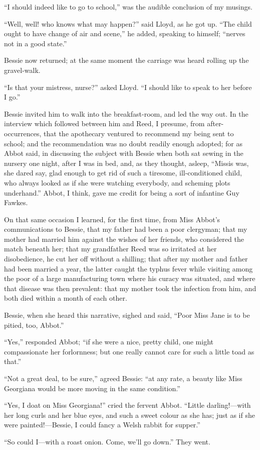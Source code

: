 \enquote{I should indeed like to go to school,} was the audible
conclusion of my musings.

\enquote{Well, well! who knows what may happen?} said \Mr{} Lloyd, as he
got up.  \enquote{The child ought to have change of air and scene,} he
added, speaking to himself; \enquote{nerves not in a good state.}

Bessie now returned; at the same moment the carriage was heard rolling
up the gravel-walk.

\enquote{Is that your mistress, nurse?} asked \Mr{} Lloyd.  \enquote{I
	should like to speak to her before I go.}

Bessie invited him to walk into the breakfast-room, and led the way
out.  In the interview which followed between him and \Mrs{} Reed, I
presume, from after-occurrences, that the apothecary ventured to
recommend my being sent to school; and the recommendation was no doubt
readily enough adopted; for as Abbot said, in discussing the subject
with Bessie when both sat sewing in the nursery one night, after I was
in bed, and, as they thought, asleep, \enquote{Missis was, she dared
	say, glad enough to get rid of such a tiresome, ill-conditioned child,
	who always looked as if she were watching everybody, and scheming plots
	underhand.}  Abbot, I think, gave me credit for being a sort of
infantine Guy Fawkes.

On that same occasion I learned, for the first time, from Miss Abbot's
communications to Bessie, that my father had been a poor clergyman; that
my mother had married him against the wishes of her friends, who
considered the match beneath her; that my grandfather Reed was so
irritated at her disobedience, he cut her off without a shilling; that
after my mother and father had been married a year, the latter caught
the typhus fever while visiting among the poor of a large manufacturing
town where his curacy was situated, and where that disease was then
prevalent: that my mother took the infection from him, and both died
within a month of each other.

Bessie, when she heard this narrative, sighed and said, \enquote{Poor
	Miss Jane is to be pitied, too, Abbot.}

\enquote{Yes,} responded Abbot; \enquote{if she were a nice, pretty
	child, one might compassionate her forlornness; but one really cannot
	care for such a little toad as that.}

\enquote{Not a great deal, to be sure,} agreed Bessie: \enquote{at any
	rate, a beauty like Miss Georgiana would be more moving in the same
	condition.}

\enquote{Yes, I doat on Miss Georgiana!} cried the fervent Abbot.
\enquote{Little darling!---with her long curls and her blue eyes, and
	such a sweet colour as she has; just as if she were painted!---Bessie, I
	could fancy a Welsh rabbit for supper.}

\enquote{So could I---with a roast onion.  Come, we'll go down.}  They
went.
